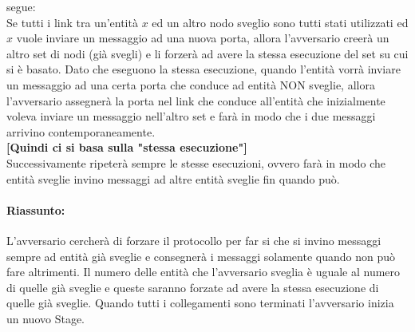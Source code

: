 \begin{enumerate}
\begin{enumerate}
                    segue:\\
                    Se tutti i link tra un'entità $x$ ed un altro nodo sveglio
                    sono tutti stati utilizzati ed $x$ vuole inviare un
                    messaggio ad una nuova porta, allora l'avversario creerà un
                    altro set di nodi (già svegli) e li forzerà ad avere la
                    stessa esecuzione del set su cui si è basato. Dato che
                    eseguono la stessa esecuzione, quando l'entità vorrà inviare
                    un messaggio ad una certa porta che conduce ad entità NON
                    sveglie, allora l'avversario assegnerà la porta nel link che
                    conduce all'entità che inizialmente voleva inviare un
                    messaggio nell'altro set e farà in modo che i due messaggi
                    arrivino contemporaneamente. \\\textbf{[Quindi ci si basa
                                sulla "stessa esecuzione"]}\\
                    Successivamente ripeterà sempre le stesse esecuzioni, ovvero
                    farà in modo che entità sveglie invino messaggi ad altre
                    entità sveglie fin quando può.
          \end{enumerate}
\end{enumerate}

\paragraph{Riassunto:} L'avversario cercherà di forzare il protocollo per far si
che si invino messaggi sempre ad entità già sveglie e consegnerà i messaggi
solamente quando non può fare altrimenti. Il numero delle entità che
l'avversario sveglia è uguale al numero di quelle già sveglie e queste saranno
forzate ad avere la stessa esecuzione di quelle già sveglie. Quando tutti i
collegamenti sono terminati l'avversario inizia un nuovo Stage.

